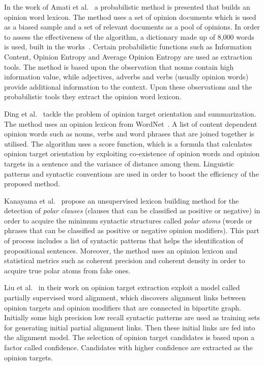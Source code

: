 In the work of Amati et al.~\cite{AABG18}
a probabilistic method is presented that builds an opinion word lexicon.
The method uses a set of opinion documents which is used as a biased sample
and a set of relevant documents as a pool of opinions.
In order to assess the effectiveness of the algorithm,
a dictionary made up of 8,000 words is used, built in the works~\cite{RW03,SV07}.
Certain probabilistic functions such as Information Content,
Opinion Entropy and Average Opinion Entropy are used as extraction tools.
The method is based upon the observation that nouns contain high information value,
while adjectives, adverbs and verbs (usually opinion words) provide additional information to the context.
Upon these observations and the probabilistic tools
they extract the opinion word lexicon.

Ding et al.~\cite{DLY08} tackle the problem of opinion target orientation
and summarization.
The method uses an opinion lexicon from WordNet~\cite{HL04}.
A list of content dependent opinion words such as nouns, verbs and word phrases
that are joined together is utilised.
The algorithm uses a score function,
which is a formula that calculates opinion target orientation
by exploiting co-existence of opinion words and opinion targets in a sentence
and the variance of distance among them.
Linguistic patterns and syntactic conventions are used
in order to boost the efficiency of the proposed method.

Kanayama et al.~\cite{KN06} propose an unsupervised lexicon building method
for the detection of \emph{polar clauses}
(clauses that can be classified as positive or negative)
in order to acquire the minimum syntactic structures called \emph{polar atoms}
(words or phrases that can be classified as positive or negative opinion modifiers).
This part of process includes a list of syntactic patterns
that helps the identification of propositional sentences.
Moreover, the method uses an opinion lexicon and statistical metrics
such as coherent precision and coherent density
in order to acquire true polar atoms from fake ones.

Liu et al.~\cite{LXLZ13} in their work on opinion target extraction
exploit a model called partially supervised word alignment,
which discovers alignment links between opinion targets and opinion modifiers
that are connected in bipartite graph.
Initially some high precision low recall syntactic patterns are used as training sets
for generating initial partial alignment links.
Then these initial links are fed into the alignment model.
The selection of opinion target candidates is based upon a factor called confidence.
Candidates with higher confidence are extracted as the opinion targets.

